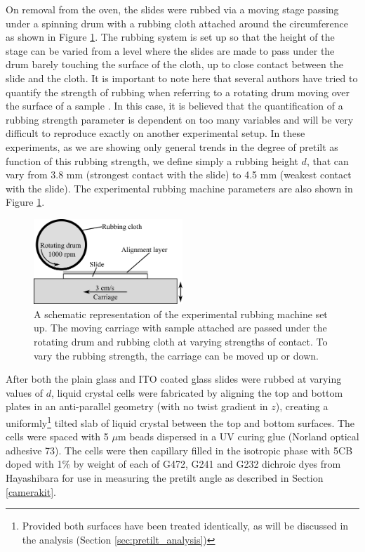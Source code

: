 On removal from the oven, the slides were rubbed via a moving stage passing under a spinning drum with a rubbing cloth attached around the circumference as shown in Figure \ref{fig:rubbingmachine}. The rubbing system is set up so that the height of the stage can be varied from a level where the slides are made to pass under the drum barely touching the surface of the cloth, up to close contact between the slide and the cloth. It is important to note here that several authors have tried to quantify the strength of rubbing when referring to a rotating drum moving over the surface of a sample \cite{Wang2007, Huang2005,Vaughn2007,Pidduck1996}. In this case, it is believed that the quantification of a rubbing strength parameter is dependent on too many variables and will be very difficult to reproduce exactly on another experimental setup. In these experiments, as we are showing only general trends in the degree of pretilt as function of this rubbing strength, we define simply a rubbing height $d$, that can vary from 3.8 mm (strongest contact with the slide) to 4.5 mm (weakest contact with the slide). The experimental rubbing machine parameters are also shown in Figure \ref{fig:rubbingmachine}.

\begin{figure}
\begin{center}
\includegraphics[width=0.5\textwidth]{Figures/Pretilt/rubbing_machine}
\end{center}
\caption[Schematic diagram of rubbing machine]{\label{fig:rubbingmachine}A schematic representation of the experimental rubbing machine set up. The moving carriage with sample attached are passed under the rotating drum and rubbing cloth at varying strengths of contact. To vary the rubbing strength, the carriage can be moved up or down.}
\end{figure}

After both the plain glass and ITO coated glass slides were rubbed at varying values of $d$, liquid crystal cells were fabricated by aligning the top and bottom plates in an anti-parallel geometry (with no twist gradient in $z$), creating a uniformly\footnote{Provided both surfaces have been treated identically, as will be discussed in the analysis (Section \ref{sec:pretilt_analysis})} tilted slab of liquid crystal between the top and bottom surfaces. The cells were spaced with 5 $\mu$m beads dispersed in a UV curing glue (Norland optical adhesive 73). The cells were then capillary filled in the isotropic phase with 5CB doped with 1\% by weight of each of G472, G241 and G232 dichroic dyes from Hayashibara for use in measuring the pretilt angle as described in Section \ref{camerakit}.


